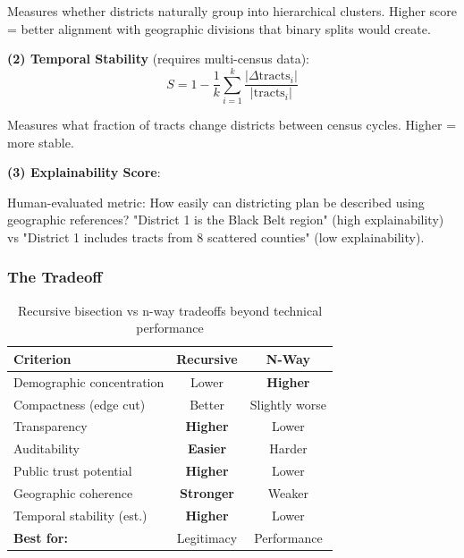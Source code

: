 Measures whether districts naturally group into hierarchical clusters. Higher score = better alignment with geographic divisions that binary splits would create.

\textbf{(2) Temporal Stability} (requires multi-census data):
\begin{equation}
S = 1 - \frac{1}{k}\sum_{i=1}^k \frac{|\Delta \text{tracts}_i|}{|\text{tracts}_i|}
\end{equation}

Measures what fraction of tracts change districts between census cycles. Higher = more stable.

\textbf{(3) Explainability Score}:

Human-evaluated metric: How easily can districting plan be described using geographic references? "District 1 is the Black Belt region" (high explainability) vs "District 1 includes tracts from 8 scattered counties" (low explainability).

\subsubsection{The Tradeoff}

\begin{table}[h]
\centering
\begin{tabular}{lcc}
\toprule
\textbf{Criterion} & \textbf{Recursive} & \textbf{N-Way} \\
\midrule
Demographic concentration & Lower & \textbf{Higher} \\
Compactness (edge cut) & Better & Slightly worse \\
Transparency & \textbf{Higher} & Lower \\
Auditability & \textbf{Easier} & Harder \\
Public trust potential & \textbf{Higher} & Lower \\
Geographic coherence & \textbf{Stronger} & Weaker \\
Temporal stability (est.) & \textbf{Higher} & Lower \\
\midrule
\textbf{Best for:} & Legitimacy & Performance \\
\bottomrule
\end{tabular}
\caption{Recursive bisection vs n-way tradeoffs beyond technical performance}
\label{tab:transparency_tradeoff}
\end{table}

